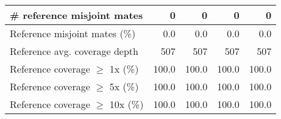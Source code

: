 \documentclass[12pt,a4paper]{article}
\begin{document}
\begin{table}[ht]
\begin{center}
\begin{tabular}{|l*{4}{|r}|}
\# reference misjoint mates & 0 & 0 & 0 & 0 \\ \hline
Reference misjoint mates (\%) & 0.0 & 0.0 & 0.0 & 0.0 \\ \hline
Reference avg. coverage depth & 507 & 507 & 507 & 507 \\ \hline
Reference coverage $\geq$ 1x (\%) & 100.0 & 100.0 & 100.0 & 100.0 \\ \hline
Reference coverage $\geq$ 5x (\%) & 100.0 & 100.0 & 100.0 & 100.0 \\ \hline
Reference coverage $\geq$ 10x (\%) & 100.0 & 100.0 & 100.0 & 100.0 \\ \hline
\end{tabular}
\end{center}
\end{table}
\end{document}
